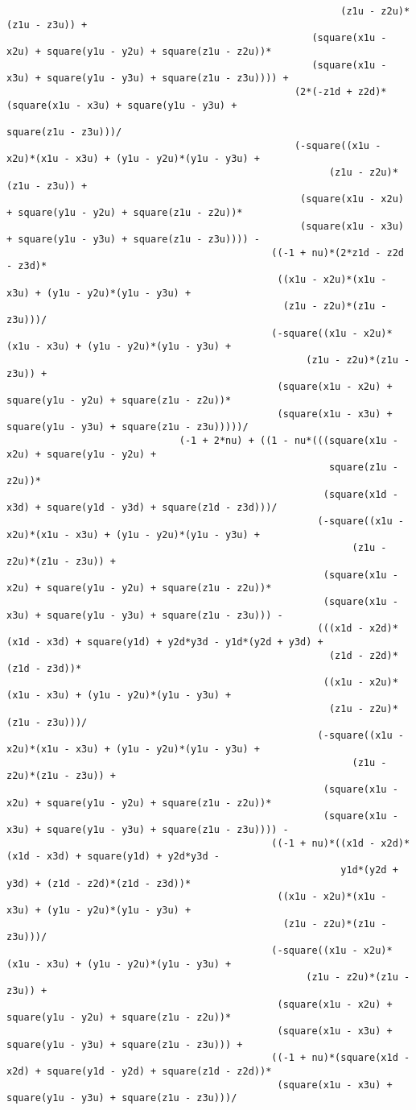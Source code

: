 \begin{lstlisting}
														  (z1u - z2u)*(z1u - z3u)) + 
													 (square(x1u - x2u) + square(y1u - y2u) + square(z1u - z2u))*
													 (square(x1u - x3u) + square(y1u - y3u) + square(z1u - z3u)))) + 
												  (2*(-z1d + z2d)*(square(x1u - x3u) + square(y1u - y3u) + 
																   square(z1u - z3u)))/
												  (-square((x1u - x2u)*(x1u - x3u) + (y1u - y2u)*(y1u - y3u) + 
														(z1u - z2u)*(z1u - z3u)) + 
												   (square(x1u - x2u) + square(y1u - y2u) + square(z1u - z2u))*
												   (square(x1u - x3u) + square(y1u - y3u) + square(z1u - z3u)))) - 
											  ((-1 + nu)*(2*z1d - z2d - z3d)*
											   ((x1u - x2u)*(x1u - x3u) + (y1u - y2u)*(y1u - y3u) + 
												(z1u - z2u)*(z1u - z3u)))/
											  (-square((x1u - x2u)*(x1u - x3u) + (y1u - y2u)*(y1u - y3u) + 
													(z1u - z2u)*(z1u - z3u)) + 
											   (square(x1u - x2u) + square(y1u - y2u) + square(z1u - z2u))*
											   (square(x1u - x3u) + square(y1u - y3u) + square(z1u - z3u)))))/
							  (-1 + 2*nu) + ((1 - nu*(((square(x1u - x2u) + square(y1u - y2u) + 
														square(z1u - z2u))*
													   (square(x1d - x3d) + square(y1d - y3d) + square(z1d - z3d)))/
													  (-square((x1u - x2u)*(x1u - x3u) + (y1u - y2u)*(y1u - y3u) + 
															(z1u - z2u)*(z1u - z3u)) + 
													   (square(x1u - x2u) + square(y1u - y2u) + square(z1u - z2u))*
													   (square(x1u - x3u) + square(y1u - y3u) + square(z1u - z3u))) - 
													  (((x1d - x2d)*(x1d - x3d) + square(y1d) + y2d*y3d - y1d*(y2d + y3d) + 
														(z1d - z2d)*(z1d - z3d))*
													   ((x1u - x2u)*(x1u - x3u) + (y1u - y2u)*(y1u - y3u) + 
														(z1u - z2u)*(z1u - z3u)))/
													  (-square((x1u - x2u)*(x1u - x3u) + (y1u - y2u)*(y1u - y3u) + 
															(z1u - z2u)*(z1u - z3u)) + 
													   (square(x1u - x2u) + square(y1u - y2u) + square(z1u - z2u))*
													   (square(x1u - x3u) + square(y1u - y3u) + square(z1u - z3u)))) - 
											  ((-1 + nu)*((x1d - x2d)*(x1d - x3d) + square(y1d) + y2d*y3d - 
														  y1d*(y2d + y3d) + (z1d - z2d)*(z1d - z3d))*
											   ((x1u - x2u)*(x1u - x3u) + (y1u - y2u)*(y1u - y3u) + 
												(z1u - z2u)*(z1u - z3u)))/
											  (-square((x1u - x2u)*(x1u - x3u) + (y1u - y2u)*(y1u - y3u) + 
													(z1u - z2u)*(z1u - z3u)) + 
											   (square(x1u - x2u) + square(y1u - y2u) + square(z1u - z2u))*
											   (square(x1u - x3u) + square(y1u - y3u) + square(z1u - z3u))) + 
											  ((-1 + nu)*(square(x1d - x2d) + square(y1d - y2d) + square(z1d - z2d))*
											   (square(x1u - x3u) + square(y1u - y3u) + square(z1u - z3u)))/

\end{lstlisting}
